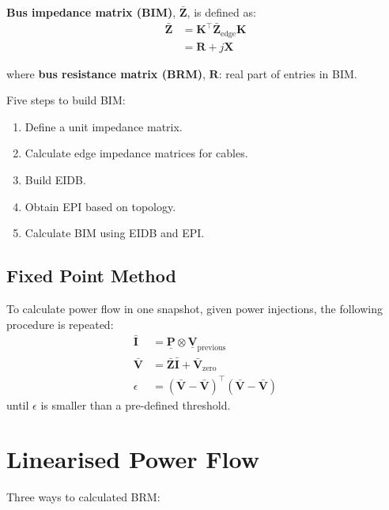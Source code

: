 \documentclass[
]{book}
\providecommand{\tightlist}{%
  \setlength{\itemsep}{0pt}\setlength{\parskip}{0pt}}
\begin{document}
\textbf{Bus impedance matrix (BIM)}, \(\boldsymbol{\bar{Z}}\), is defined as:
\[ \begin{aligned}
  \boldsymbol{\bar{Z}}
    &= \boldsymbol{K}^{\top} \boldsymbol{\bar{Z}}_\text{edge}
    \boldsymbol{K} \\
    &= \boldsymbol{R} + j \boldsymbol{X}
\end{aligned} \]

where \textbf{bus resistance matrix (BRM)}, \(\boldsymbol{R}\): real part of entries
in BIM.

Five steps to build BIM:

\begin{enumerate}
\def\labelenumi{\arabic{enumi}.}
\tightlist
\item
  Define a unit impedance matrix.
\item
  Calculate edge impedance matrices for cables.
\item
  Build EIDB.
\item
  Obtain EPI based on topology.
\item
  Calculate BIM using EIDB and EPI.
\end{enumerate}

\hypertarget{fixed-point-method}{%
\section{Fixed Point Method}\label{fixed-point-method}}

To calculate power flow in one snapshot, given power injections, the following
procedure is repeated:
\[ \begin{aligned}
    \boldsymbol{\bar{I}} &= \boldsymbol{\underline{P}}
      \otimes \boldsymbol{\underline{V}}_\text{previous} \\
    \boldsymbol{\bar{V}}
    &= \boldsymbol{\bar{Z}} \boldsymbol{\bar{I}}
      + \boldsymbol{\bar{V}}_\text{zero} \\
    \epsilon
    &= \left( \boldsymbol{\bar{V}} - \boldsymbol{\bar{V}} \right)^\top
      \left( \boldsymbol{\bar{V}} - \boldsymbol{\bar{V}} \right)
\end{aligned} \]
until \(\epsilon\) is smaller than a pre-defined threshold.

\hypertarget{linearised-power-flow}{%
\chapter{Linearised Power Flow}\label{linearised-power-flow}}

Three ways to calculated BRM:
\end{document}
